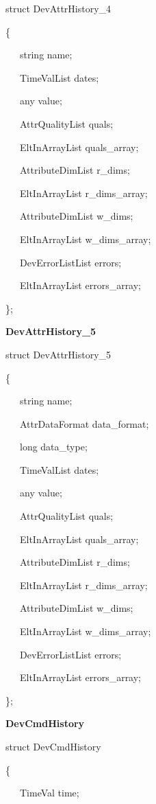 struct DevAttrHistory\_4

\{

~~~string name;

~~~TimeValList dates;

~~~any value;

~~~AttrQualityList quals;

~~~EltInArrayList quals\_array;

~~~AttributeDimList r\_dims;

~~~EltInArrayList r\_dims\_array;

~~~AttributeDimList w\_dims;

~~~EltInArrayList w\_dims\_array;

~~~DevErrorListList errors;

~~~EltInArrayList errors\_array;

\};\\

\begin{flushleft}
\textbf{DevAttrHistory\_5}
\par\end{flushleft}

struct DevAttrHistory\_5

\{

~~~string name;

~~~AttrDataFormat data\_format;

~~~long data\_type;

~~~TimeValList dates;

~~~any value;

~~~AttrQualityList quals;

~~~EltInArrayList quals\_array;

~~~AttributeDimList r\_dims;

~~~EltInArrayList r\_dims\_array;

~~~AttributeDimList w\_dims;

~~~EltInArrayList w\_dims\_array;

~~~DevErrorListList errors;

~~~EltInArrayList errors\_array;

\};\\

\begin{flushleft}
\textbf{DevCmdHistory}
\par\end{flushleft}

struct DevCmdHistory

\{

~~~TimeVal time;

